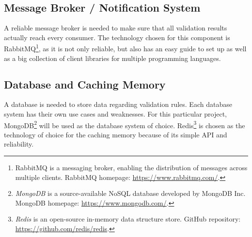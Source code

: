  \subsection{Message Broker / Notification System}
 A reliable message broker is needed to make sure that all validation results actually reach every consumer. The technology chosen for this component is RabbitMQ\footnote{RabbitMQ is a messaging broker, enabling the distribution of messages across multiple clients. RabbitMQ homepage: \url{https://www.rabbitmq.com/}.}, as it is not only reliable, but also has an easy guide to set up as well as a big collection of client libraries for multiple programming languages.

 \subsection{Database and Caching Memory}
 A database is needed to store data regarding validation rules. Each database system has their own use cases and weaknesses. For this particular project, MongoDB\footnote{\emph{MongoDB} is a source-available NoSQL database developed by MongoDB Inc. MongoDB homepage: \url{https://www.mongodb.com/}.} will be used as the database system of choice. Redis\footnote{\emph{Redis} is an open-source in-memory data structure store. GitHub repository: \url{https://github.com/redis/redis}.} is chosen as the technology of choice for the caching memory because of its simple API and reliability. 